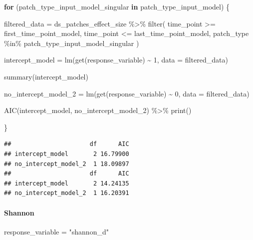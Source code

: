 \documentclass[
]{article}
\newenvironment{Shaded}{\begin{snugshade}}{\end{snugshade}}
\newcommand{\AttributeTok}[1]{\textcolor[rgb]{0.77,0.63,0.00}{#1}}
\newcommand{\ControlFlowTok}[1]{\textcolor[rgb]{0.13,0.29,0.53}{\textbf{#1}}}
\newcommand{\DecValTok}[1]{\textcolor[rgb]{0.00,0.00,0.81}{#1}}
\newcommand{\FunctionTok}[1]{\textcolor[rgb]{0.00,0.00,0.00}{#1}}
\newcommand{\NormalTok}[1]{#1}
\newcommand{\OtherTok}[1]{\textcolor[rgb]{0.56,0.35,0.01}{#1}}
\newcommand{\SpecialCharTok}[1]{\textcolor[rgb]{0.00,0.00,0.00}{#1}}
\newcommand{\StringTok}[1]{\textcolor[rgb]{0.31,0.60,0.02}{#1}}
\begin{document}
\begin{Shaded}
\begin{Highlighting}[]
\ControlFlowTok{for}\NormalTok{ (patch\_type\_input\_model\_singular }\ControlFlowTok{in}\NormalTok{ patch\_type\_input\_model) \{}
  
\NormalTok{  filtered\_data }\OtherTok{=}\NormalTok{ ds\_patches\_effect\_size }\SpecialCharTok{\%\textgreater{}\%}
    \FunctionTok{filter}\NormalTok{(}
\NormalTok{        time\_point }\SpecialCharTok{\textgreater{}=}\NormalTok{ first\_time\_point\_model,}
\NormalTok{        time\_point }\SpecialCharTok{\textless{}=}\NormalTok{ last\_time\_point\_model,}
\NormalTok{        patch\_type }\SpecialCharTok{\%in\%}\NormalTok{ patch\_type\_input\_model\_singular}
\NormalTok{    )}
  
\NormalTok{  intercept\_model }\OtherTok{=} \FunctionTok{lm}\NormalTok{(}\FunctionTok{get}\NormalTok{(response\_variable) }\SpecialCharTok{\textasciitilde{}}
                         \DecValTok{1}\NormalTok{,}
                       \AttributeTok{data =}\NormalTok{ filtered\_data)}
  
  \FunctionTok{summary}\NormalTok{(intercept\_model)}
  
\NormalTok{  no\_intercept\_model\_2 }\OtherTok{=} \FunctionTok{lm}\NormalTok{(}\FunctionTok{get}\NormalTok{(response\_variable) }\SpecialCharTok{\textasciitilde{}}
                              \DecValTok{0}\NormalTok{,}
                            \AttributeTok{data =}\NormalTok{ filtered\_data)}
  
  \FunctionTok{AIC}\NormalTok{(intercept\_model, no\_intercept\_model\_2) }\SpecialCharTok{\%\textgreater{}\%}
    \FunctionTok{print}\NormalTok{()}
  
\NormalTok{\}}
\end{Highlighting}
\end{Shaded}

\begin{verbatim}
##                      df      AIC
## intercept_model       2 16.79900
## no_intercept_model_2  1 18.09897
##                      df      AIC
## intercept_model       2 14.24135
## no_intercept_model_2  1 16.20391
\end{verbatim}

\hypertarget{shannon-5}{%
\paragraph{Shannon}\label{shannon-5}}

\begin{Shaded}
\begin{Highlighting}[]
\NormalTok{response\_variable }\OtherTok{=} \StringTok{"shannon\_d"}
\end{Highlighting}
\end{Shaded}
\end{document}
